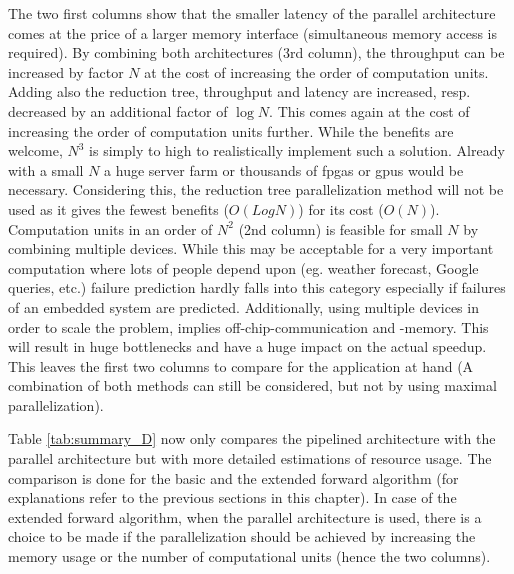 \documentclass[mscthesis]{usiinfthesis}
\begin{document}
The two first columns show that the smaller latency of the parallel
architecture comes at the price of a larger memory interface (simultaneous
memory access is required). By combining both architectures (3rd column), the
throughput can be increased by factor $N$ at the cost of increasing the order
of computation units. Adding also the reduction tree, throughput and latency
are increased, resp. decreased by an additional factor of $\log N$. This comes
again at the cost of increasing the order of computation units further. While
the benefits are welcome, $N^3$ is simply to high to realistically implement
such a solution.  Already with a small $N$ a huge server farm or thousands of
\glspl{fpga} or \glspl{gpu} would be necessary. Considering this, the reduction
tree parallelization method will not be used as it gives the fewest benefits
($O(LogN)$) for its cost ($O(N)$).  Computation units in an order of $N^2$ (2nd
column) is feasible for small $N$ by combining multiple devices. While this may
be acceptable for a very important computation where lots of people depend upon
(eg. weather forecast, Google queries, etc.) failure prediction hardly falls
into this category especially if failures of an embedded system are predicted.
Additionally, using multiple devices in order to scale the problem, implies
off-chip-communication and -memory. This will result in huge bottlenecks and
have a huge impact on the actual speedup. This leaves the first two columns to
compare for the application at hand (A combination of both methods can still be
considered, but not by using maximal parallelization).

Table \ref{tab:summary_D} now only compares the pipelined architecture with the
parallel architecture but with more detailed estimations of resource usage.
The comparison is done for the basic and the extended forward algorithm (for
explanations refer to the previous sections in this chapter). In case of the
extended forward algorithm, when the parallel architecture is used, there is
a choice to be made if the parallelization should be achieved by increasing the
memory usage or the number of computational units (hence the two columns).
\end{document}
